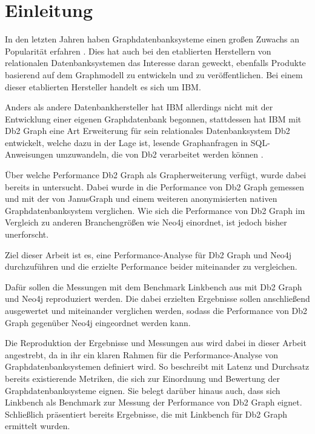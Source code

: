 \chapter{Einleitung}
\label{einleitung}

In den letzten Jahren haben Graphdatenbanksysteme einen großen Zuwachs an Popularität erfahren \cite{db_engines_ranking_july}. Dies hat auch bei den etablierten Herstellern von relationalen Datenbanksystemen das Interesse daran geweckt, ebenfalls Produkte basierend auf dem Graphmodell zu entwickeln und zu veröffentlichen. Bei einem dieser etablierten Hersteller handelt es sich um IBM. 

Anders als andere Datenbankhersteller hat IBM allerdings nicht mit der Entwicklung einer eigenen Graphdatenbank begonnen, stattdessen hat IBM mit Db2 Graph eine Art Erweiterung für sein relationales Datenbanksystem Db2 entwickelt, welche dazu in der Lage ist, lesende Graphanfragen in SQL-Anweisungen umzuwandeln, die von Db2 verarbeitet werden können \cite{sigmod_tian}. 

Über welche Performance Db2 Graph als Grapherweiterung verfügt, wurde dabei bereits in \cite{sigmod_tian} untersucht. Dabei wurde in \cite{sigmod_tian} die Performance von Db2 Graph gemessen und mit der von JanusGraph und einem weiteren anonymisierten nativen Graphdatenbanksystem verglichen. Wie sich die Performance von Db2 Graph im Vergleich zu anderen Branchengrößen wie Neo4j einordnet, ist jedoch bisher unerforscht. 

Ziel dieser Arbeit ist es, eine Performance-Analyse für Db2 Graph und Neo4j durchzuführen und die erzielte Performance beider miteinander zu vergleichen.

Dafür sollen die Messungen mit dem Benchmark Linkbench aus \cite{sigmod_tian} mit Db2 Graph und Neo4j reproduziert werden. Die dabei erzielten Ergebnisse sollen anschließend ausgewertet und miteinander verglichen werden, sodass die Performance von Db2 Graph gegenüber Neo4j eingeordnet werden kann.

Die Reproduktion der Ergebnisse und Messungen aus \cite{sigmod_tian} wird dabei in dieser Arbeit angestrebt, da in ihr ein klaren Rahmen für die Performance-Analyse von Graphdatenbanksystemen definiert wird. So beschreibt \cite{sigmod_tian} mit Latenz und Durchsatz bereits existierende Metriken, die sich zur Einordnung und Bewertung der Graphdatenbanksysteme eignen. Sie belegt darüber hinaus auch, dass sich Linkbench als Benchmark zur Messung der Performance von Db2 Graph eignet. Schließlich präsentiert \cite{sigmod_tian} bereits Ergebnisse, die mit Linkbench für Db2 Graph ermittelt wurden. 

